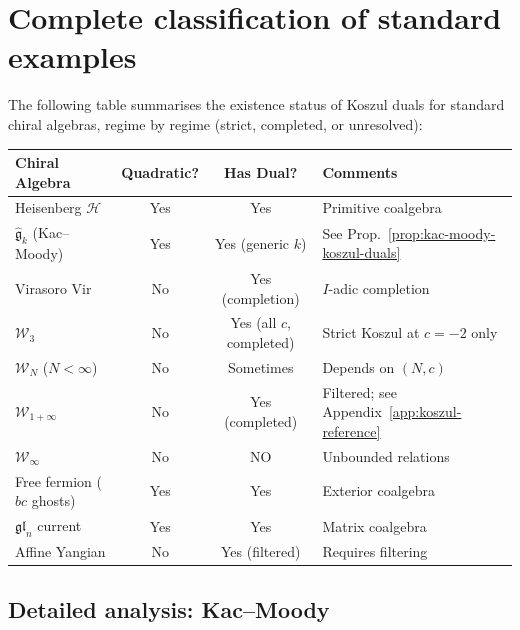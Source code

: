 
\section{Complete classification of standard examples}
\label{sec:classification-standard-examples}

\begin{proposition}\label{prop:classification-table}
The following table summarises the existence status of Koszul duals for
standard chiral algebras, regime by regime (strict, completed, or
unresolved):

\begin{center}
\small
\begin{tabular}{|l|c|c|l|}
\hline
\textbf{Chiral Algebra} & \textbf{Quadratic?} & \textbf{Has Dual?} & \textbf{Comments} \\
\hline
Heisenberg $\mathcal{H}$ & Yes & Yes & Primitive coalgebra \\
\hline
$\widehat{\mathfrak{g}}_k$ (Kac--Moody) & Yes & Yes (generic $k$) & See Prop.~\ref{prop:kac-moody-koszul-duals} \\
\hline
Virasoro $\text{Vir}$ & No & Yes (completion) & $I$-adic completion \\
\hline
$\mathcal{W}_3$ & No & Yes (all $c$, completed) & Strict Koszul at $c = -2$ only \\
\hline
$\mathcal{W}_N$ ($N < \infty$) & No & Sometimes & Depends on $(N, c)$ \\
\hline
$\mathcal{W}_{1+\infty}$ & No & Yes (completed) & Filtered; see Appendix~\ref{app:koszul-reference} \\
\hline
$\mathcal{W}_\infty$ & No & NO & Unbounded relations \\
\hline
Free fermion ($bc$ ghosts) & Yes & Yes & Exterior coalgebra \\
\hline
$\mathfrak{gl}_n$ current & Yes & Yes & Matrix coalgebra \\
\hline
Affine Yangian & No & Yes (filtered) & Requires filtering \\
\hline
\end{tabular}
\end{center}
\end{proposition}

\subsection{Detailed analysis: Kac--Moody}

